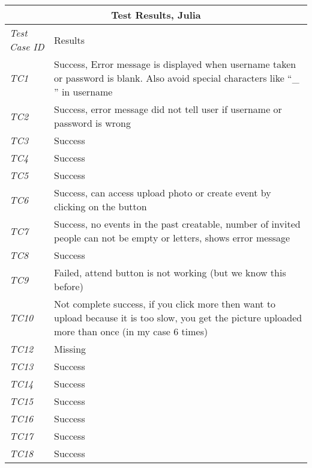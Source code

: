 \begin{minipage}{\linewidth}
\setlength{\tabcolsep}{15pt}
\centering
{}
\begin{tabular}{ |l|p{70mm}| }
	\hline
	\multicolumn{2}{|c|}{\cellcolor{gray!25} \textbf{Test Results, Julia}} \\
	\hline
	\it{\cellcolor{gray!25}Test Case ID} & {\cellcolor{gray!25} Results } \\
	\hline
	\it{\cellcolor{gray!25}TC1} & Success, 
Error message is displayed when username taken or password is blank. Also avoid special characters like “\_ ” in username \\ \hline
	\it{\cellcolor{gray!25}TC2} & Success, error message did not tell user if username or password is wrong \\ \hline
	\it{\cellcolor{gray!25}TC3} & Success \\ \hline
	\it{\cellcolor{gray!25}TC4} & Success \\ \hline
	\it{\cellcolor{gray!25}TC5} & Success \\ \hline
	\it{\cellcolor{gray!25}TC6} & Success, can access upload photo or create event by clicking on the button \\ \hline
	\it{\cellcolor{gray!25}TC7} & Success, no events in the past creatable, number of invited people can not be empty or letters, shows error message \\ \hline
	\it{\cellcolor{gray!25}TC8} & Success \\ \hline
	\it{\cellcolor{gray!25}TC9} & Failed, attend button is not working (but we know this before) \\ \hline
	\it{\cellcolor{gray!25}TC10} & Not complete success, if you click more then want to upload because it is too slow, you get the picture uploaded more than once (in my case 6 times) \\ \hline
	\it{\cellcolor{gray!25}TC12} & Missing \\ \hline
	\it{\cellcolor{gray!25}TC13} & Success \\ \hline
	\it{\cellcolor{gray!25}TC14} & Success \\ \hline
	\it{\cellcolor{gray!25}TC15} & Success \\ \hline
	\it{\cellcolor{gray!25}TC16} & Success \\ \hline
	\it{\cellcolor{gray!25}TC17} & Success \\ \hline
	\it{\cellcolor{gray!25}TC18} & Success \\ \hline
	\hline
\end{tabular}
\medskip
\end{minipage}

